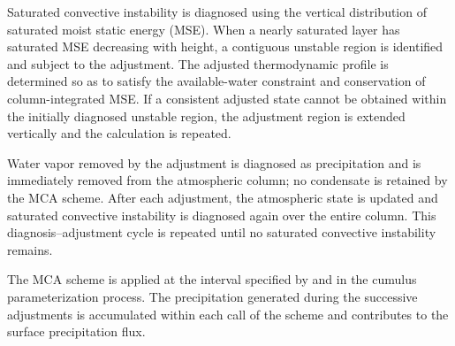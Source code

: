 Saturated convective instability is diagnosed using the vertical distribution of saturated moist static energy (MSE).
When a nearly saturated layer has saturated MSE decreasing with height, a contiguous unstable region is identified and subject to the adjustment.
The adjusted thermodynamic profile is determined so as to satisfy the available-water constraint and conservation of column-integrated MSE.
If a consistent adjusted state cannot be obtained within the initially diagnosed unstable region, the adjustment region is extended vertically and the calculation is repeated.

Water vapor removed by the adjustment is diagnosed as precipitation and is immediately removed from the atmospheric column; no condensate is retained by the MCA scheme.
After each adjustment, the atmospheric state is updated and saturated convective instability is diagnosed again over the entire column.
This diagnosis--adjustment cycle is repeated until no saturated convective instability remains.

The MCA scheme is applied at the interval specified by  and  in the cumulus parameterization process.
The precipitation generated during the successive adjustments is accumulated within each call of the scheme and contributes to the surface precipitation flux.
